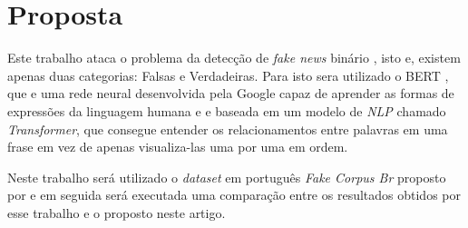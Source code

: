 \section{Proposta}

Este trabalho ataca o problema da detecção de \textit{fake news} binário \cite{}, isto e, existem apenas duas categorias: Falsas e Verdadeiras. Para isto sera utilizado o BERT \cite{}, que e uma rede neural desenvolvida pela Google capaz de aprender as formas de expressões da linguagem humana e e baseada em um modelo de \textit{NLP} chamado \textit{Transformer}, que consegue entender os relacionamentos entre palavras em uma frase em vez de apenas visualiza-las uma por uma em ordem.


Neste trabalho será utilizado o \textit{dataset} em português \textit{Fake Corpus Br} proposto por \citet{Silva2020} e em seguida será executada uma comparação entre os resultados obtidos por esse trabalho e o proposto neste artigo.








